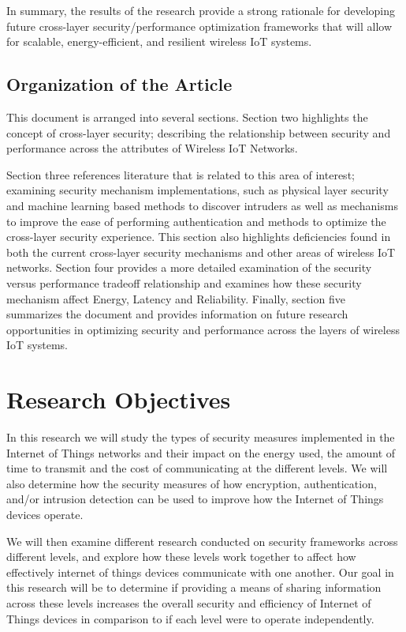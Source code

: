 \documentclass[a4paper,fleqn]{cas-dc}
\numberwithin{equation}{section}
\begin{document}
In summary, the results of the research provide a strong rationale for developing future cross-layer security/performance optimization frameworks that will allow for scalable, energy-efficient, and resilient wireless IoT systems.




\subsection{Organization of the Article}

This document is arranged into several sections. Section two highlights the concept of cross-layer security; describing the relationship between security and performance across the attributes of Wireless IoT Networks.

Section three references literature that is related to this area of interest; examining security mechanism implementations, such as physical layer security and machine learning based methods to discover intruders as well as mechanisms to improve the ease of performing authentication and methods to optimize the cross-layer security experience. This section also highlights deficiencies found in both the current cross-layer security mechanisms and other areas of wireless IoT networks. Section four provides a more detailed examination of the security versus performance tradeoff relationship and examines how these security mechanism affect Energy, Latency and Reliability. Finally, section five summarizes the document and provides information on future research opportunities in optimizing security and performance across the layers of wireless IoT systems.

\section{Research Objectives}



In this research we will study the types of security measures implemented in the Internet of Things networks and their impact on the energy used, the amount of time to transmit and the cost of communicating at the different levels. We will also determine how the security measures of how encryption, authentication, and/or intrusion detection can be used to improve how the Internet of Things devices operate.



We will then examine different research conducted on security frameworks across different levels, and explore how these levels work together to affect how effectively internet of things devices communicate with one another. Our goal in this research will be to determine if providing a means of sharing information across these levels increases the overall security and efficiency of Internet of Things devices in comparison to if each level were to operate independently.
\end{document}
